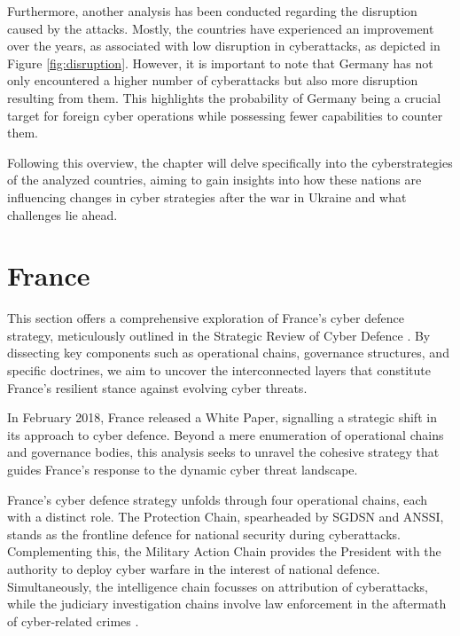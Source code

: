 Furthermore, another analysis has been conducted regarding the disruption caused by the attacks. Mostly, the countries have experienced an improvement over the years, as associated with low disruption in cyberattacks, as depicted in Figure \ref{fig:disruption}. However, it is important to note that Germany has not only encountered a higher number of cyberattacks but also more disruption resulting from them. This highlights the probability of Germany being a crucial target for foreign cyber operations while possessing fewer capabilities to counter them.

Following this overview, the chapter will delve specifically into the cyberstrategies of the analyzed countries, aiming to gain insights into how these nations are influencing changes in cyber strategies after the war in Ukraine and what challenges lie ahead.


\section{France}

This section offers a comprehensive exploration of France's cyber defence strategy, meticulously outlined in the Strategic Review of Cyber Defence \autocite{sgdsn_2018_strategic}. By dissecting key components such as operational chains, governance structures, and specific doctrines, we aim to uncover the interconnected layers that constitute France's resilient stance against evolving cyber threats.

In February 2018, France released a White Paper, signalling a strategic shift in its approach to cyber defence. Beyond a mere enumeration of operational chains and governance bodies, this analysis seeks to unravel the cohesive strategy that guides France's response to the dynamic cyber threat landscape.

France's cyber defence strategy unfolds through four operational chains, each with a distinct role. The Protection Chain, spearheaded by SGDSN and ANSSI, stands as the frontline defence for national security during cyberattacks. Complementing this, the Military Action Chain provides the President with the authority to deploy cyber warfare in the interest of national defence. Simultaneously, the intelligence chain focusses on attribution of cyberattacks, while the judiciary investigation chains involve law enforcement in the aftermath of cyber-related crimes \autocite{sgdsn_2018_strategic, anssi_2022_le}.


